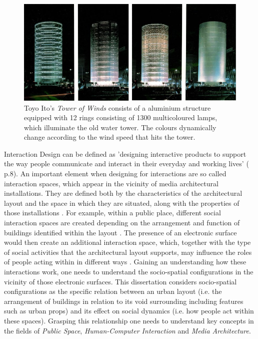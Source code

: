 \begin{figure}[!t] 
\centering
\includegraphics[width=\textwidth]{Illustrations/Ito_T_WindTower_c_El_Croquis_1986.jpg}
\caption[\textit{Tower of Winds} by Toyo Ito, 1986, Image taken from El Croquis]{Toyo Ito's \textit{Tower of Winds} consists of a aluminium structure equipped with 12 rings consisting of 1300 multicoloured lamps, which  illuminate the old water tower. The colours dynamically change according to the wind speed that hits the tower.}
\label{Towerofwinds}
\end{figure}


Interaction Design can be defined as 'designing interactive products to support the way people communicate and interact in their everyday and working lives' (\cite{Rogers_2015} p.8). 
An important element when designing for interactions are so called interaction spaces, which appear in the vicinity of media architectural installations. They are defined both by the characteristics of the architectural layout and the space in which they are situated, along with the properties of those installations \cite{Oneill_2006}. 
For example, within a public place, different social interaction spaces are created depending on the arrangement and function of buildings identified within the layout \cite{Behrens_2014} \cite{Goffman_1966}. 
The presence of an electronic surface would then create an additional interaction space, which, together with the type of social activities that the architectural layout supports, may influence the roles of people acting within in different ways \cite{Fatah_2010}.
Gaining an understanding how these interactions work, one needs to understand the socio-spatial configurations in the vicinity of those electronic surfaces.
This dissertation considers socio-spatial configurations as the specific relation between an urban layout (i.e. the arrangement of buildings in relation to its void surrounding including features such as urban props) and its effect on social dynamics (i.e. how people act within these spaces). 
Grasping this relationship one needs to understand key concepts in the fields of \textit{Public Space}, \textit{Human-Computer Interaction} and \textit{Media Architecture}.   






